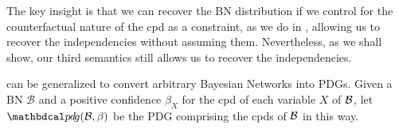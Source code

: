 \documentclass{article}
\begin{document}
	    
	    The key insight is that we can recover the BN distribution if we control for
        the counterfactual nature of the cpd as a constraint, as we
        do in , allowing us to recover the
        independencies without assuming them.
	    Nevertheless, as we shall show, our third semantics still allows us to
	    recover the independencies.
	
	 can be generalized to convert arbitrary Bayesian Networks into PDGs.
	Given a BN $\mathcal B$ and a positive confidence $\beta_X$ for
	the cpd of each variable $X$ of $\cal B$,
	let $\PDGof{\mathcal B, \beta}$
	be the PDG comprising the cpds of $\cal B$
	in this way. %
	
\end{document}

